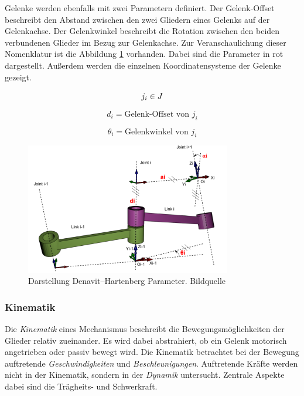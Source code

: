 Gelenke werden ebenfalls mit zwei Parametern definiert. Der Gelenk-Offset beschreibt den Abstand zwischen den zwei Gliedern eines Gelenks auf der Gelenkachse. Der Gelenkwinkel beschreibt die Rotation zwischen den beiden verbundenen Glieder im Bezug zur Gelenkachse\citep{Corke2011}.  Zur Veranschaulichung dieser Nomenklatur ist die Abbildung \ref{fig:ik-dh} vorhanden. Dabei sind die Parameter in rot dargestellt. Außerdem werden die einzelnen Koordinatensysteme der Gelenke gezeigt.

\begin{displaymath}
j_i \in J \\
\end{displaymath}

\begin{equation}
d_i =  \text{Gelenk-Offset von } j_i
\end{equation}

\begin{equation}
\theta_i =  \text{Gelenkwinkel von } j_i 
\end{equation}

\begin{figure}[H]
	\centering
	\includegraphics[width=0.8\textwidth]{fig/dh}   
	\caption[Darstellung Denavit–Hartenberg Parameter]{Darstellung Denavit–Hartenberg Parameter. Bildquelle \cite{wiki}}
	\label{fig:ik-dh}
\end{figure}

\subsubsection{Kinematik}
\label{sec:basics-ik-k}

Die \textit{Kinematik} eines Mechanismus beschreibt die Bewegungsmöglichkeiten der Glieder relativ zueinander. Es wird dabei abstrahiert, ob ein Gelenk motorisch angetrieben oder passiv bewegt wird. Die Kinematik betrachtet bei der Bewegung auftretende \textit{Geschwindigkeiten} und \textit{Beschleunigungen}. Auftretende Kräfte werden nicht in der Kinematik, sondern in der \textit{Dynamik} untersucht. Zentrale Aspekte dabei sind die Trägheits- und Schwerkraft.

